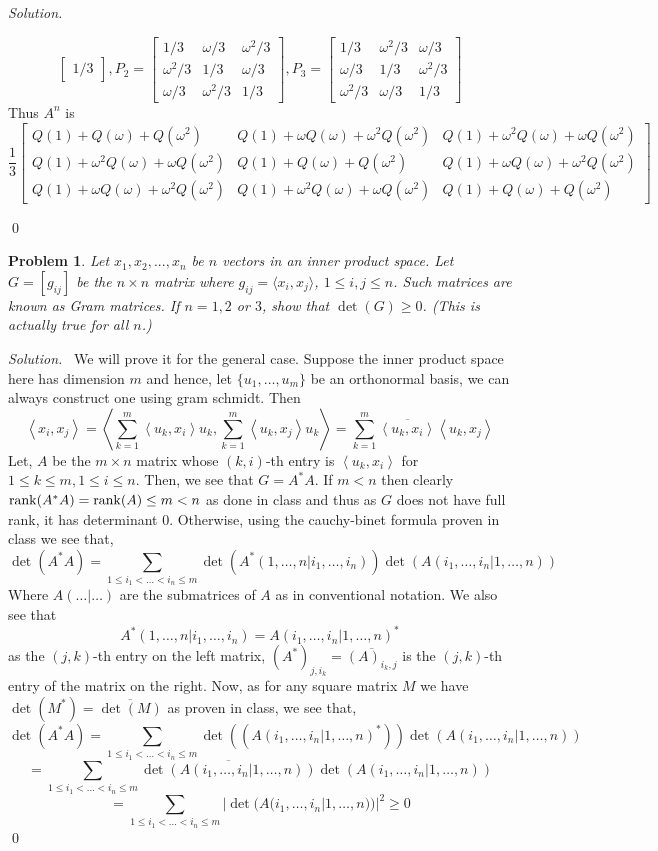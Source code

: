 \documentclass[12pt,a4paper]{article}
\newenvironment{solution}{%
  \par\noindent\textit{Solution.}\ }{\qed}
\theoremstyle{problemstyle}
\newtheorem{problem}{Problem}[section]
\def\w{\omega}
\newcommand{\ipp}[1]{{\left\langle{#1}\right\rangle}}
\begin{document}
\begin{solution}
\begin{enumerate}[label=(\roman*)]
$$\begin{bmatrix}
1/3\end{bmatrix},P_2=\begin{bmatrix}1/3 & \w/3 & \w^2/3\\ \w^2/3 & 1/3 &
\w/3\\ \w/3 & \w^2/3 & 1/3\end{bmatrix}, P_3=\begin{bmatrix}1/3 & \omega^2/3 & \omega/3\\ \w/3 & 1/3 & \w^2/3\\ \w^2/3 & \w/3 & 1/3\end{bmatrix}$$
Thus $A^n$ is
$$
\frac{1}{3}
\begin{bmatrix}
Q(1) + Q(\w) + Q(\w^2) & Q(1) + \w Q(\w) + \w^2 Q(\w^2) & Q(1) + \w^2 Q(\w) + \w Q(\w^2) \\
Q(1) + \w^2 Q(\w) + \w Q(\w^2) & Q(1) + Q(\w) + Q(\w^2) & Q(1) + \w Q(\w) + \w^2 Q(\w^2) \\
Q(1) + \w Q(\w) + \w^2 Q(\w^2) & Q(1) + \w^2 Q(\w) + \w Q(\w^2) & Q(1) + Q(\w) + Q(\w^2)
\end{bmatrix}
$$
\end{enumerate}
\end{solution}
\begin{problem}\label{prob:2-4}
Let $x_{1},x_{2},...,x_{n}$ be $n$ vectors in an inner product space. Let $G=[g_{ij}]$ be the $n\times n$ matrix where $g_{ij}=\langle x_{i},x_{j}\rangle$, $1 \le i, j \le n$. Such matrices are known as Gram matrices. If $n=1, 2$ or $3$, show that $\det(G)\ge0$. (This is actually true for all $n$.)
\end{problem}
\begin{solution}
We will prove it for the general case. Suppose the inner product space here has dimension $m$ and hence, let $\{u_1,\ldots,u_m\}$ be an orthonormal basis, we can always construct one using gram schmidt. Then
$$\ipp{x_i,x_j}=\ipp{\sum_{k=1}^m\ipp{u_k,x_i}u_k,\sum_{k=1}^m\ipp{u_k,x_j}u_k}=\sum_{k=1}^m\overline{\ipp{u_k,x_i}}\ipp{u_k,x_j}$$
Let, $A$ be the $m\times n$ matrix whose $(k,i)$-th entry is $\ipp{u_k,x_i}$ for $1\leq k\leq m,1\leq i\leq n.$ Then, we see that $G=A^*A$. If $m<n$ then clearly $\rank (A^*A)=\rank(A)\leq m<n$ as done in class and thus as $G$ does not have full rank, it has determinant $0$. Otherwise, using the cauchy-binet formula proven in class we see that,
$$\det(A^*A)=\sum_{1\leq i_1<\ldots<i_n\leq m}\det(A^*(1,\ldots,n|i_1,\ldots,i_n))\det(A(i_1,\ldots,i_n|1,\ldots,n))$$
Where $A(\ldots|\ldots)$ are the submatrices of $A$ as in conventional notation. We also see that 
$$A^*(1,\ldots,n|i_1,\ldots,i_n)=A(i_1,\ldots,i_n|1,\ldots,n)^*$$
as the $(j,k)$-th entry on the left matrix, $(A^*)_{j,i_k}=\overline{(A)_{i_k,j}}$ is the $(j,k)$-th entry of the matrix on the right. Now, as for any square matrix $M$ we have $\det(M^*)=\overline{\det(M)}$ as proven in class, we see that,
$$\det(A^*A)=\sum_{1\leq i_1<\ldots<i_n\leq m}\det((A(i_1,\ldots,i_n|1,\ldots,n)^*))\det(A(i_1,\ldots,i_n|1,\ldots,n))$$
$$=\sum_{1\leq i_1<\ldots<i_n\leq m}\overline{\det(A(i_1,\ldots,i_n|1,\ldots,n))}\det(A(i_1,\ldots,i_n|1,\ldots,n))$$
$$=\sum_{1\leq i_1<\ldots<i_n\leq m}|\det(A(i_1,\ldots,i_n|1,\ldots,n))|^2\geq 0$$
\end{solution}
\end{document}
